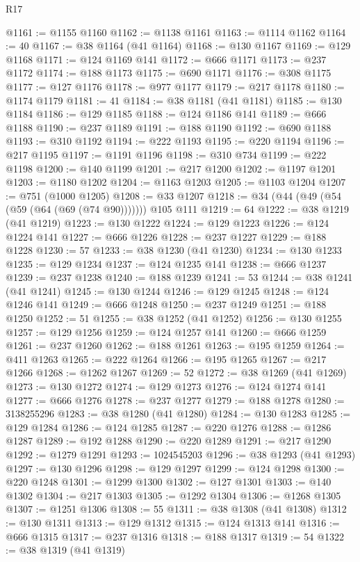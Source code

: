 \begin{lexlean}{R17}
\begin{coremodule}
@1161 := @1155 @1160
@1162 := @1138 @1161
@1163 := @1114 @1162
@1164 := 40
@1167 := @38 @1164 (@41 @1164)
@1168 := @130 @1167
@1169 := @129 @1168
@1171 := @124 @1169 @141
@1172 := @666 @1171
@1173 := @237 @1172
@1174 := @188 @1173
@1175 := @690 @1171
@1176 := @308 @1175
@1177 := @127 @1176
@1178 := @977 @1177
@1179 := @217 @1178
@1180 := @1174 @1179
@1181 := 41
@1184 := @38 @1181 (@41 @1181)
@1185 := @130 @1184
@1186 := @129 @1185
@1188 := @124 @1186 @141
@1189 := @666 @1188
@1190 := @237 @1189
@1191 := @188 @1190
@1192 := @690 @1188
@1193 := @310 @1192
@1194 := @222 @1193
@1195 := @220 @1194
@1196 := @217 @1195
@1197 := @1191 @1196
@1198 := @310 @734
@1199 := @222 @1198
@1200 := @140 @1199
@1201 := @217 @1200
@1202 := @1197 @1201
@1203 := @1180 @1202
@1204 := @1163 @1203
@1205 := @1103 @1204
@1207 := @751 (@1000 @1205)
@1208 := @33 @1207
@1218 := @34 (@44 (@49 (@54 (@59 (@64 (@69 (@74 @90))))))) @105 @111
@1219 := 64
@1222 := @38 @1219 (@41 @1219)
@1223 := @130 @1222
@1224 := @129 @1223
@1226 := @124 @1224 @141
@1227 := @666 @1226
@1228 := @237 @1227
@1229 := @188 @1228
@1230 := 57
@1233 := @38 @1230 (@41 @1230)
@1234 := @130 @1233
@1235 := @129 @1234
@1237 := @124 @1235 @141
@1238 := @666 @1237
@1239 := @237 @1238
@1240 := @188 @1239
@1241 := 53
@1244 := @38 @1241 (@41 @1241)
@1245 := @130 @1244
@1246 := @129 @1245
@1248 := @124 @1246 @141
@1249 := @666 @1248
@1250 := @237 @1249
@1251 := @188 @1250
@1252 := 51
@1255 := @38 @1252 (@41 @1252)
@1256 := @130 @1255
@1257 := @129 @1256
@1259 := @124 @1257 @141
@1260 := @666 @1259
@1261 := @237 @1260
@1262 := @188 @1261
@1263 := @195 @1259
@1264 := @411 @1263
@1265 := @222 @1264
@1266 := @195 @1265
@1267 := @217 @1266
@1268 := @1262 @1267
@1269 := 52
@1272 := @38 @1269 (@41 @1269)
@1273 := @130 @1272
@1274 := @129 @1273
@1276 := @124 @1274 @141
@1277 := @666 @1276
@1278 := @237 @1277
@1279 := @188 @1278
@1280 := 3138255296
@1283 := @38 @1280 (@41 @1280)
@1284 := @130 @1283
@1285 := @129 @1284
@1286 := @124 @1285
@1287 := @220 @1276
@1288 := @1286 @1287
@1289 := @192 @1288
@1290 := @220 @1289
@1291 := @217 @1290
@1292 := @1279 @1291
@1293 := 1024545203
@1296 := @38 @1293 (@41 @1293)
@1297 := @130 @1296
@1298 := @129 @1297
@1299 := @124 @1298
@1300 := @220 @1248
@1301 := @1299 @1300
@1302 := @127 @1301
@1303 := @140 @1302
@1304 := @217 @1303
@1305 := @1292 @1304
@1306 := @1268 @1305
@1307 := @1251 @1306
@1308 := 55
@1311 := @38 @1308 (@41 @1308)
@1312 := @130 @1311
@1313 := @129 @1312
@1315 := @124 @1313 @141
@1316 := @666 @1315
@1317 := @237 @1316
@1318 := @188 @1317
@1319 := 54
@1322 := @38 @1319 (@41 @1319)

\end{coremodule}
\end{lexlean}
